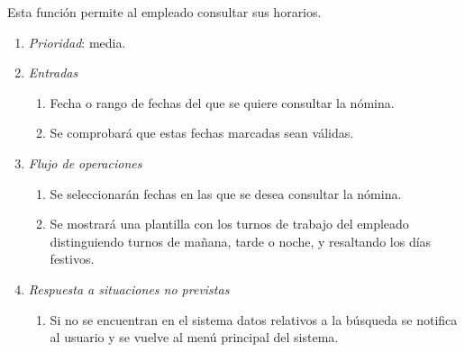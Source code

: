 	Esta función permite al empleado consultar sus horarios.

\begin{enumerate}
	\item \textit{Prioridad}: media.
	\item \textit{Entradas}
	\begin{enumerate}
		\item Fecha o rango de fechas del que se quiere consultar la nómina.
		\item Se comprobará que estas fechas marcadas sean válidas.
	\end{enumerate}
	\item \textit{Flujo de operaciones}
	\begin{enumerate}
		\item Se seleccionarán fechas en las que se desea consultar la nómina.
		\item Se mostrará una plantilla con los turnos de trabajo del empleado distinguiendo turnos de mañana, tarde o noche, y resaltando los días festivos.
	\end{enumerate}
	\item \textit{Respuesta a situaciones no previstas}
	\begin{enumerate}
		\item Si no se encuentran en el sistema datos relativos a la búsqueda se notifica al usuario y se vuelve al menú principal del sistema.
	\end{enumerate}
\end{enumerate}
